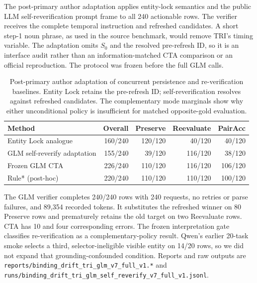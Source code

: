 \documentclass[10pt]{article}
\begin{document}
The post-primary author adaptation applies entity-lock semantics and the public LLM
self-reverification prompt frame to all 240 actionable \NewSchemaReplication{} rows. The verifier
receives the complete temporal instruction and refreshed candidates. A short step-1 noun phrase,
as used in the source benchmark, would remove TRI's timing variable. The adaptation omits $S_0$ and
the resolved pre-refresh ID, so it is an interface audit rather than an information-matched CTA
comparison or an official reproduction. The protocol was frozen before the full GLM calls.

\begin{table}[H]
\centering
\small
\begin{tabular}{lrrrr}
\toprule
Method & Overall & Preserve & Reevaluate & PairAcc \\
\midrule
Entity Lock analogue & 160/240 & 120/120 & 40/120 & 40/120 \\
GLM self-reverify adaptation & 155/240 & 39/120 & 116/120 & 38/120 \\
Frozen GLM CTA & 226/240 & 110/120 & 116/120 & 106/120 \\
Rule* (post-hoc) & 220/240 & 110/120 & 110/120 & 100/120 \\
\bottomrule
\end{tabular}
\caption{Post-primary author adaptation of concurrent persistence and re-verification baselines.
Entity Lock retains the pre-refresh ID; self-reverification resolves against refreshed candidates.
The complementary mode marginals show why either unconditional policy is insufficient for matched
opposite-gold evaluation.}
\label{tab:supp-binding-drift-adaptation}
\end{table}

The GLM verifier completes 240/240 rows with 240 requests, no retries or parse failures, and
89,354 recorded tokens. It substitutes the refreshed winner on 80 Preserve rows and prematurely
retains the old target on two Reevaluate rows. CTA has 10 and four corresponding errors. The frozen
interpretation gate classifies re-verification as a complementary-policy result. Qwen's earlier
20-task smoke selects a third, selector-ineligible visible entity on 14/20 rows, so we did not
expand that grounding-confounded condition. Reports and raw outputs are
\texttt{reports/binding\_drift\_tri\_glm\_v7\_full\_v1.*} and
\texttt{runs/binding\_drift\_tri\_glm\_self\_reverify\_v7\_full\_v1.jsonl}.
\end{document}
